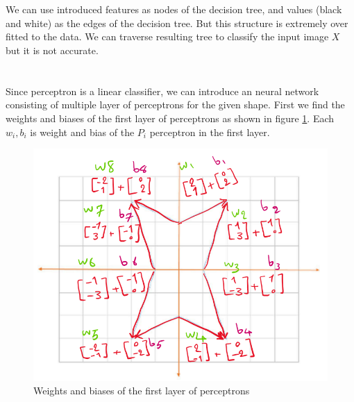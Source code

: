 \documentclass[en]{university}
\begin{document}
\setupdocument

\section{}

\subsection{}


\subsection{}

We can use introduced features as nodes of the decision tree, and values (black and white) as the edges of the decision tree. But 
this structure is extremely over fitted to the data. We can traverse resulting tree to classify the input image $X$ but it is not 
accurate.

\section{}



\section{}

Since perceptron is a linear classifier, we can introduce an neural network consisting of multiple layer of perceptrons for the given shape. 
First we find the weights and biases of the first layer of perceptrons as shown in figure \ref{fig:w}. Each $w_i, b_i$ is weight and bias 
of the $P_i$ perceptron in the first layer.

\begin{figure}[!htbp]
\centering
\includegraphics[width=1\textwidth]{assets/3w.png}
\caption{Weights and biases of the first layer of perceptrons}
\label{fig:w}
\end{figure}
\end{document}
